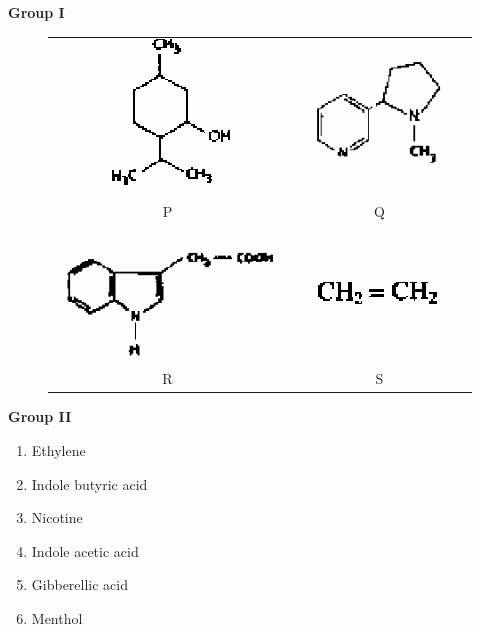\documentclass[journal,12pt,onecolumn]{IEEEtran}
\theoremstyle{remark}
\begin{document}
\begin{enumerate}
    \begin{minipage}{0.6\textwidth}
        \textbf{Group I }
        \begin{figure}[H]
            \centering
            \begin{tabular}{cc}
                 \includegraphics[width=0.3\columnwidth]{fig30.png} & \includegraphics[width=0.3\columnwidth]{fig31.png} \\
                 P & Q \\[1em]
                 \includegraphics[width=0.3\columnwidth]{fig32.png} & \includegraphics[width=0.3\columnwidth]{fig33.png} \\
                 R & S
            \end{tabular}
            \caption*{}
            \label{fig:q14group}
        \end{figure}
    \end{minipage}%
    \begin{minipage}{0.4\textwidth}
        \textbf{Group II }
        \begin{enumerate}
            \item Ethylene
            \item Indole butyric acid
            \item Nicotine
            \item Indole acetic acid
            \item Gibberellic acid
            \item Menthol
        \end{enumerate}
    \end{minipage}


\end{enumerate}
\end{document}
